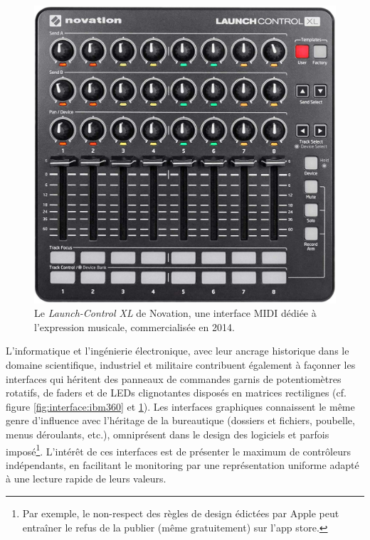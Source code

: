 \begin{figure}[!htbp]
\begin{minipage}[t]{0.48\textwidth}
	    \includegraphics[width=\linewidth]{gfx/05_interfaces/NovationLaunchControlXL.jpg}
		\caption[L'interface MIDI Novation Launch-Control-XL]{Le \textit{Launch-Control XL} de Novation, une interface \gls{MIDI} dédiée à l'expression musicale, commercialisée en 2014.}
		\label{fig:interface:launchpad-controlXL}
	\end{minipage}
\end{figure}

\noindent L'informatique et l'ingénierie électronique, avec leur ancrage historique dans le domaine scientifique, industriel et militaire contribuent également à façonner les interfaces qui héritent des panneaux de commandes garnis de potentiomètres rotatifs, de faders et de LEDs clignotantes disposés en matrices rectilignes (cf. figure \ref{fig:interface:ibm360} et \ref{fig:interface:launchpad-controlXL}). Les interfaces graphiques connaissent le même genre d'influence avec l'héritage de la bureautique (dossiers et fichiers, poubelle, menus déroulants, etc.), omniprésent dans le design des logiciels et parfois imposé\footnote{Par exemple, le non-respect des règles de design édictées par Apple peut entraîner le refus de la publier (même gratuitement) sur l'app store.}. L'intérêt de ces interfaces est de présenter le maximum de contrôleurs indépendants, en facilitant le monitoring par une représentation uniforme adapté à une lecture rapide de leurs valeurs.


